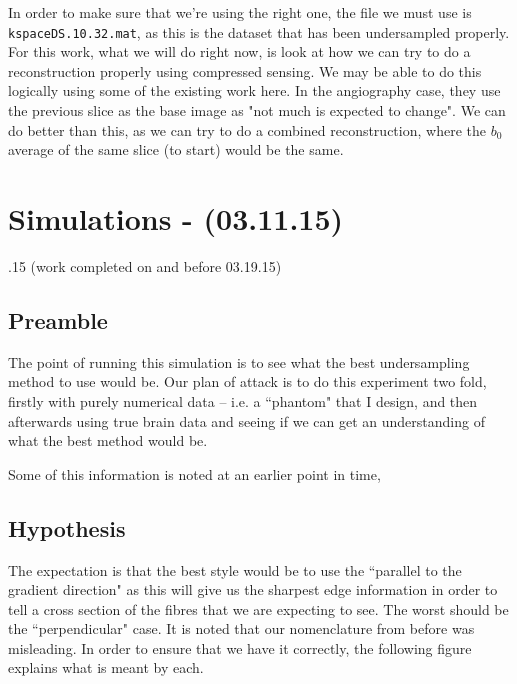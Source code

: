 \documentclass[11 pt]{article}
\let\oldsection\section
\renewcommand\section{\clearpage\newpage\oldsection}
\begin{document}
  In order to make sure that we're using the right one, the file we must use is \verb!kspaceDS.10.32.mat!, as this is the dataset that has been undersampled properly. For this work, what we will do right now, is look at how we can try to do a reconstruction properly using compressed sensing. We may be able to do this logically using some of the existing work here. In the angiography case, they use the previous slice as the base image as "not much is expected to change". We can do better than this, as we can try to do a combined reconstruction, where the $b_0$ average of the same slice (to start) would be the same. 

\section{Simulations - (03.11.15)}
.15 (work completed on and before 03.19.15)
  \subsection{Preamble}

  The point of running this simulation is to see what the best undersampling method to use would be. Our plan of attack is to do this experiment two fold, firstly with purely numerical data -- i.e. a ``phantom" that I design, and then afterwards using true brain data and seeing if we can get an understanding of what the best method would be. 
  
  Some of this information is noted at an earlier point in time, 

  \subsection{Hypothesis}

  The expectation is that the best style would be to use the ``parallel to the gradient direction" as this will give us the sharpest edge information in order to tell a cross section of the fibres that we are expecting to see. The worst should be the ``perpendicular" case. It is noted that our nomenclature from before was misleading. In order to ensure that we have it correctly, the following figure explains what is meant by each.
\end{document}
